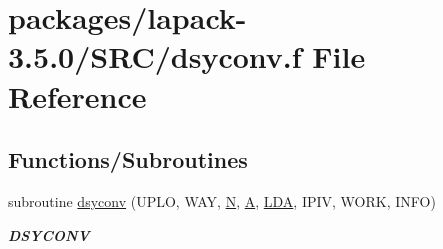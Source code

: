 \hypertarget{dsyconv_8f}{}\section{packages/lapack-\/3.5.0/\+S\+R\+C/dsyconv.f File Reference}
\label{dsyconv_8f}
\subsection*{Functions/\+Subroutines}
\begin{DoxyCompactItemize}
\item 
subroutine \hyperlink{group__doubleSYcomputational_ga0c0fa63d66cedb3f1a3a2abcd38224e7}{dsyconv} (U\+P\+L\+O, W\+A\+Y, \hyperlink{polmisc_8c_a0240ac851181b84ac374872dc5434ee4}{N}, \hyperlink{classA}{A}, \hyperlink{example__user_8c_ae946da542ce0db94dced19b2ecefd1aa}{L\+D\+A}, I\+P\+I\+V, W\+O\+R\+K, I\+N\+F\+O)
\begin{DoxyCompactList}\small\item\em {\bfseries D\+S\+Y\+C\+O\+N\+V} \end{DoxyCompactList}\end{DoxyCompactItemize}
